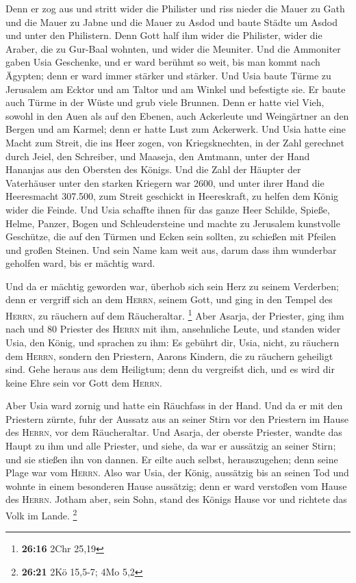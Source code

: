  Denn er zog aus und stritt wider die Philister und riss
nieder die Mauer zu Gath und die Mauer zu Jabne und die Mauer zu Asdod
und baute Städte um Asdod und unter den Philistern.  Denn
Gott half ihm wider die Philister, wider die Araber, die zu Gur-Baal
wohnten, und wider die Meuniter.  Und die Ammoniter gaben
Usia Geschenke, und er ward berühmt so weit, bis man kommt nach Ägypten;
denn er ward immer stärker und stärker.  Und Usia baute
Türme zu Jerusalem am Ecktor und am Taltor und am Winkel und befestigte
sie.  Er baute auch Türme in der Wüste und grub viele
Brunnen. Denn er hatte viel Vieh, sowohl in den Auen als auf den Ebenen,
auch Ackerleute und Weingärtner an den Bergen und am Karmel; denn er
hatte Lust zum Ackerwerk.  Und Usia hatte eine Macht zum
Streit, die ins Heer zogen, von Kriegsknechten, in der Zahl gerechnet
durch Jeiel, den Schreiber, und Maaseja, den Amtmann, unter der Hand
Hananjas aus den Obersten des Königs.  Und die Zahl der
Häupter der Vaterhäuser unter den starken Kriegern war 2600,
 und unter ihrer Hand die Heeresmacht 307.500, zum Streit
geschickt in Heereskraft, zu helfen dem König wider die Feinde.
 Und Usia schaffte ihnen für das ganze Heer Schilde,
Spieße, Helme, Panzer, Bogen und Schleudersteine  und
machte zu Jerusalem kunstvolle Geschütze, die auf den Türmen und Ecken
sein sollten, zu schießen mit Pfeilen und großen Steinen. Und sein Name
kam weit aus, darum dass ihm wunderbar geholfen ward, bis er mächtig
ward.

 Und da er mächtig geworden war, überhob sich sein Herz
zu seinem Verderben; denn er vergriff sich an dem \textsc{Herrn}, seinem
Gott, und ging in den Tempel des \textsc{Herrn}, zu räuchern auf dem
Räucheraltar. \footnote{\textbf{26:16} 2Chr 25,19}  Aber
Asarja, der Priester, ging ihm nach und 80 Priester des \textsc{Herrn}
mit ihm, ansehnliche Leute,  und standen wider Usia, den
König, und sprachen zu ihm: Es gebührt dir, Usia, nicht, zu räuchern dem
\textsc{Herrn}, sondern den Priestern, Aarons Kindern, die zu räuchern
geheiligt sind. Gehe heraus aus dem Heiligtum; denn du vergreifst dich,
und es wird dir keine Ehre sein vor Gott dem \textsc{Herrn}.

 Aber Usia ward zornig und hatte ein Räuchfass in der
Hand. Und da er mit den Priestern zürnte, fuhr der Aussatz aus an seiner
Stirn vor den Priestern im Hause des \textsc{Herrn}, vor dem
Räucheraltar.  Und Asarja, der oberste Priester, wandte
das Haupt zu ihm und alle Priester, und siehe, da war er aussätzig an
seiner Stirn; und sie stießen ihn von dannen. Er eilte auch selbst,
herauszugehen; denn seine Plage war vom \textsc{Herrn}. 
Also war Usia, der König, aussätzig bis an seinen Tod und wohnte in
einem besonderen Hause aussätzig; denn er ward verstoßen vom Hause des
\textsc{Herrn}. Jotham aber, sein Sohn, stand des Königs Hause vor und
richtete das Volk im Lande. \footnote{\textbf{26:21} 2Kö 15,5-7; 4Mo 5,2}


